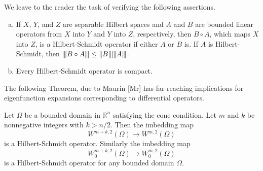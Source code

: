 \begin{para}
  We leave to the reader the task of verifying the following assertions.
  \begin{enumerate}[(a)]
    \item If $X$, $Y$, and $Z$ are separable Hilbert spaces and $A$ and $B$
      are bounded linear operators from $X$ into $Y$ and $Y$ into $Z$, respectively,
      then $B\circ A$, which maps $X$ into $Z$, is a Hilbert-Schmidt operator
      if either $A$ or $B$ is. If $A$ is Hilbert-Schmidt,
      then $\opnorm{B\circ A}\leq\|B\|\opnorm{A}$.
    \item Every Hilbert-Schmidt operator is compact.
  \end{enumerate}
  The following Theorem, due to Maurin [Mr] has far-reaching implications for
  eigenfunction expansions corresponding to differential operators.
\end{para}


\begin{theorem}
  Let $\Omega$ be a bounded domain in $\mathbb{R}^n$ satisfying the cone condition.
  Let $m$ and $k$ be nonnegative integers with $k>n/2$. Then the imbedding map
  \begin{equation}\label{eq:6.33}
    W^{m+k,2}(\Omega) \to W^{m,2}(\Omega)
  \end{equation}
  is a Hilbert-Schmidt operator. Similarly the imbedding map
  \begin{equation}\label{eq:6.34}
    W_0^{m+k,2}(\Omega) \to W_0^{m,2}(\Omega)
  \end{equation}
  is a Hilbert-Schmidt operator for any bounded domain $\Omega$.
\end{theorem}

